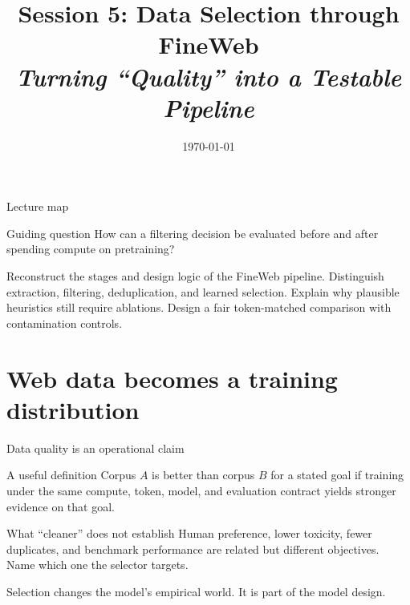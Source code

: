 \documentclass[handout]{beamer}
\title[TLM -- Session 05]{Session 5: Data Selection through FineWeb\\[4pt]
\normalsize\itshape Turning ``Quality'' into a Testable Pipeline}
\date{\today}
\begin{document}
\makelecturetitle

\begin{frame}{Lecture map}
  \tableofcontents
  \vfill
  \begin{block}{Guiding question}
    How can a filtering decision be evaluated before and after spending compute on pretraining?
  \end{block}
\end{frame}

\learninggoals
  {Reconstruct the stages and design logic of the FineWeb pipeline.}
  {Distinguish extraction, filtering, deduplication, and learned selection.}
  {Explain why plausible heuristics still require ablations.}
  {Design a fair token-matched comparison with contamination controls.}

\section{Web data becomes a training distribution}

\begin{frame}{Data quality is an operational claim}
  \begin{block}{A useful definition}
    Corpus $A$ is better than corpus $B$ for a stated goal if training under the same compute, token, model, and evaluation contract yields stronger evidence on that goal.
  \end{block}
  \begin{alertblock}{What ``cleaner'' does not establish}
    Human preference, lower toxicity, fewer duplicates, and benchmark performance are related but different objectives. Name which one the selector targets.
  \end{alertblock}
  \vfill
  \centering Selection changes the model's empirical world. It is part of the model design.
\end{frame}
\end{document}
